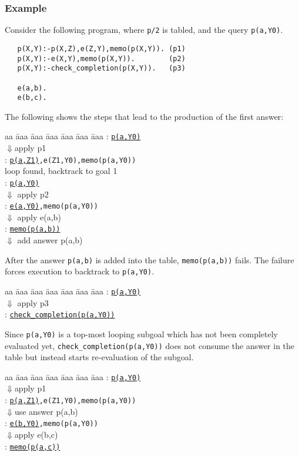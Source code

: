 \documentclass{tlp}
\begin{document}
\subsubsection{Example}
Consider the following program, where {\tt p/2} is tabled, and the query {\tt p(a,Y0)}.
\begin{verbatim}
   p(X,Y):-p(X,Z),e(Z,Y),memo(p(X,Y)). (p1)
   p(X,Y):-e(X,Y),memo(p(X,Y)).        (p2)       
   p(X,Y):-check_completion(p(X,Y)).   (p3)

   e(a,b).                             
   e(b,c).                             
\end{verbatim}
The following shows the steps that lead to the production of the first answer:
\begin{tabbing}
aa \= aaa \= aaa \= aaa \= aaa \= aaa \= aaa \kill
\> : {\tt \underline{p(a,Y0)}} \\
\> \> \> $\Downarrow${\scriptsize apply p1} \\
\> : {\tt \underline{p(a,Z1)},e(Z1,Y0),memo(p(a,Y0))} \\
\> \> \> {\scriptsize loop found, backtrack to goal 1} \\
\> : {\tt \underline{p(a,Y0)}} \\
\> \> \> $\Downarrow$ {\scriptsize apply p2} \\
\> : {\tt \underline{e(a,Y0)},memo(p(a,Y0))} \\
\> \> \> $\Downarrow$ {\scriptsize apply e(a,b)} \\
\> : {\tt \underline{memo(p(a,b))}} \\
\> \> \> $\Downarrow$ {\scriptsize add answer p(a,b)} 
\end{tabbing}      
After the answer {\tt p(a,b)} is added into the table, {\tt memo(p(a,b))} fails. The failure forces execution to backtrack to {\tt p(a,Y0)}.
\begin{tabbing}
aa \= aaa \= aaa \= aaa \= aaa \= aaa \= aaa \kill
\> : {\tt \underline{p(a,Y0)}} \\
\> \> \> $\Downarrow$ {\scriptsize apply p3} \\
\> : {\tt \underline{check\_completion(p(a,Y0))}} 
\end{tabbing}      
Since {\tt p(a,Y0)} is a top-most looping subgoal which has not been completely evaluated yet, {\tt check\_completion(p(a,Y0))} does not consume the answer in the table but instead starts re-evaluation of the subgoal.
\begin{tabbing}
aa \= aaa \= aaa \= aaa \= aaa \= aaa \= aaa \kill
\> : {\tt \underline{p(a,Y0)}} \\
\> \> \> $\Downarrow${\scriptsize apply p1} \\
\> : {\tt \underline{p(a,Z1)},e(Z1,Y0),memo(p(a,Y0))} \\
\> \> \> $\Downarrow${\scriptsize use answer p(a,b)} \\
\> : {\tt \underline{e(b,Y0)},memo(p(a,Y0))} \\
\> \> \> $\Downarrow${\scriptsize apply e(b,c)} \\
\> : {\tt \underline{memo(p(a,c))}}
\end{tabbing}      
\end{document}
